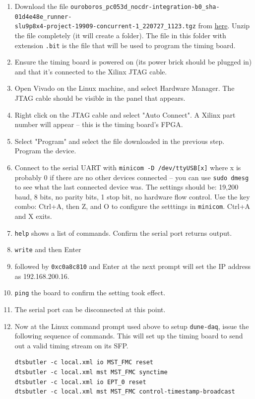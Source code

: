\documentclass[a4paper,12pt]{article}
\begin{document}
    \begin{enumerate}
        \item Download the file \texttt{ouroboros\_pc053d\_nocdr-integration-b0\_sha-01d4e48e\_runner-\\slu9p8x4-project-19909-concurrent-1\_220727\_1123.tgz} from \href{https://pdts-fw.web.cern.ch/pdts-fw/index.php?p=tags%2Fnocdr_integration%2Fb0%2Fpipeline4286375&view=ouroboros_pc053d_nocdr-integration-b0_sha-01d4e48e_runner-slu9p8x4-project-19909-concurrent-1_220727_1123.tgz}{here}. Unzip the file completely (it will create a folder). The file in this folder with extension \texttt{.bit} is the file that will be used to program the timing board.
        \item Ensure the timing board is powered on (its power brick should be plugged in) and that it's connected to the Xilinx JTAG cable.
        \item Open Vivado on the Linux machine, and select Hardware Manager. The JTAG cable should be visible in the panel that appears. 
        \item Right click on the JTAG cable and select "Auto Connect". A Xilinx part number will appear -- this is the timing board's FPGA.
        \item Select "Program" and select the file downloaded in the previous step. Program the device.
        \item Connect to the serial UART with \texttt{minicom -D /dev/ttyUSB[x]} where x is probably 0 if there are no other devices connected -- you can use 
        \texttt{sudo dmesg} to see what the last connected device was. The settings should be: 19,200 baud, 8 bits, no parity bits, 1 stop bit, no hardware flow control. Use the key combo: Ctrl+A, then Z, and O to configure the setttings in \texttt{minicom}. Ctrl+A and X exits.
        \item \texttt{help} shows a list of commands. Confirm the serial port returns output.
        \item \texttt{write} and then Enter
        \item followed by \texttt{0xc0a8c810} and Enter at the next prompt will set the IP address as 192.168.200.16.
        \item \texttt{ping} the board to confirm the setting took effect.
        \item The serial port can be disconnected at this point.
        \item Now at the Linux command prompt used above to setup \texttt{dune-daq}, issue the following sequence of commands. This will set up the timing board to send out a valid timing stream on its SFP.
\begin{verbatim}
dtsbutler -c local.xml io MST_FMC reset
dtsbutler -c local.xml mst MST_FMC synctime
dtsbutler -c local.xml io EPT_0 reset
dtsbutler -c local.xml mst MST_FMC control-timestamp-broadcast
\end{verbatim}
    \end{enumerate}
\end{document}

